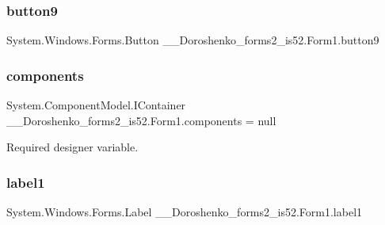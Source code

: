 \hypertarget{class__7___doroshenko__forms2__is52_1_1_form1_a9a7934f9b7f1ecce1063994427111b61}{}\label{class__7___doroshenko__forms2__is52_1_1_form1_a9a7934f9b7f1ecce1063994427111b61} 
\subsubsection{\texorpdfstring{button9}{button9}}
{\footnotesize\ttfamily System.\+Windows.\+Forms.\+Button \+\_\+\_\+\+Doroshenko\+\_\+forms2\+\_\+is52.\+Form1.\+button9\hspace{0.3cm}{\ttfamily [private]}}

\hypertarget{class__7___doroshenko__forms2__is52_1_1_form1_abe30f7b7be7a7b7fd89bdf3064ec2b39}{}\label{class__7___doroshenko__forms2__is52_1_1_form1_abe30f7b7be7a7b7fd89bdf3064ec2b39} 
\subsubsection{\texorpdfstring{components}{components}}
{\footnotesize\ttfamily System.\+Component\+Model.\+I\+Container \+\_\+\_\+\+Doroshenko\+\_\+forms2\+\_\+is52.\+Form1.\+components = null\hspace{0.3cm}{\ttfamily [private]}}



Required designer variable. 

\hypertarget{class__7___doroshenko__forms2__is52_1_1_form1_a10e4148efab88e904c57b32fa0e04442}{}\label{class__7___doroshenko__forms2__is52_1_1_form1_a10e4148efab88e904c57b32fa0e04442} 
\subsubsection{\texorpdfstring{label1}{label1}}
{\footnotesize\ttfamily System.\+Windows.\+Forms.\+Label \+\_\+\_\+\+Doroshenko\+\_\+forms2\+\_\+is52.\+Form1.\+label1\hspace{0.3cm}{\ttfamily [private]}}

